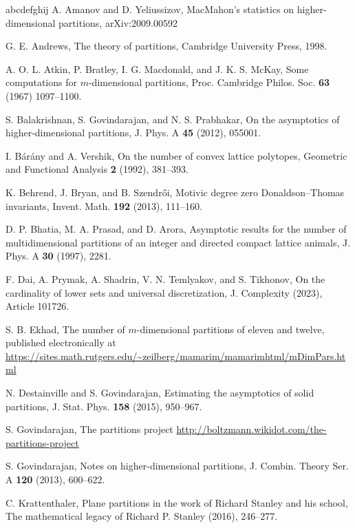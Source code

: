 \documentclass[12pt]{amsart}
\theoremstyle{definition}
\theoremstyle{remark}
\begin{document}
\begin{thebibliography}{abcdefghij}
A. Amanov and D. Yeliussizov, MacMahon's statistics on higher-dimensional partitions, arXiv:2009.00592

G. E. Andrews, The theory of partitions, %
Cambridge University Press, 1998.

A. O. L. Atkin, P. Bratley, I. G. Macdonald, and J. K. S. McKay, Some computations for $m$-dimensional partitions, Proc. Cambridge Philos. Soc. {\bf 63} (1967) 1097--1100.

S. Balakrishnan, S. Govindarajan, and N. S. Prabhakar, On the asymptotics of higher-dimensional partitions, J. Phys. A {\bf 45} (2012), 055001.

I. B\'ar\'any and A. Vershik, On the number of convex lattice polytopes, Geometric and Functional Analysis {\bf 2} (1992), 381--393.

K. Behrend, J. Bryan, and B. Szendr\H{o}i, Motivic degree zero Donaldson--Thomas invariants, Invent. Math. {\bf 192} (2013), 111--160.

D. P. Bhatia, M. A. Prasad, and D. Arora, Asymptotic results for the number of multidimensional partitions of an integer and directed compact lattice animals, J. Phys. A {\bf 30} (1997), 2281.

F. Dai, A. Prymak, A. Shadrin, V. N. Temlyakov, and S. Tikhonov, On the cardinality of lower sets and universal discretization, J. Complexity (2023), Article 101726.

S. B. Ekhad, The number of $m$-dimensional partitions of eleven and twelve, published electronically at \url{https://sites.math.rutgers.edu/~zeilberg/mamarim/mamarimhtml/mDimPars.html}

N. Destainville and S. Govindarajan, Estimating the asymptotics of solid partitions, J. Stat. Phys. {\bf 158} (2015), 950--967.

S. Govindarajan, The partitions project \url{http://boltzmann.wikidot.com/the-partitions-project}

S. Govindarajan, Notes on higher-dimensional partitions, J. Combin. Theory Ser. A {\bf 120} (2013), 600--622.

C. Krattenthaler, Plane partitions in the work of Richard Stanley and his school, The mathematical
legacy of Richard P. Stanley (2016), 246--277.


\end{thebibliography}
\end{document}
